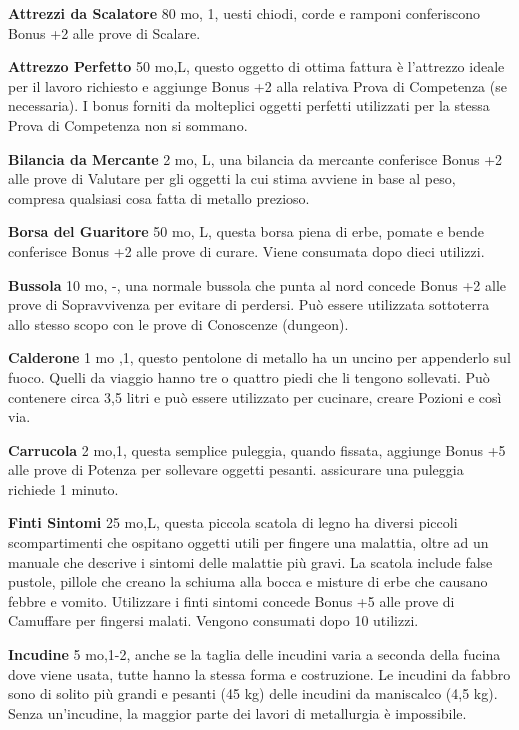 \documentclass[a4paper,11pt,twoside,openany]{book}
\begin{document}
{\textbf{Attrezzi da Scalatore} 80 mo, 1, uesti chiodi, corde e ramponi conferiscono Bonus +2 alle prove di Scalare.

\textbf{Attrezzo Perfetto} 50 mo,L, questo oggetto di ottima fattura è l'attrezzo ideale per il lavoro richiesto e aggiunge Bonus +2 alla relativa Prova di Competenza (se necessaria). I bonus forniti da molteplici oggetti perfetti utilizzati per la stessa Prova di Competenza non si sommano.

\textbf{Bilancia da Mercante} 2 mo, L, una bilancia da mercante conferisce Bonus +2 alle prove di Valutare per gli oggetti la cui stima avviene in base al peso, compresa qualsiasi cosa fatta di metallo prezioso.

\textbf{Borsa del Guaritore} 50 mo, L, questa borsa piena di erbe, pomate e bende conferisce Bonus +2 alle prove di curare. Viene consumata dopo dieci utilizzi.

\textbf{Bussola} 10 mo, -, una normale bussola che punta al nord concede Bonus +2 alle prove di Sopravvivenza per evitare di perdersi. Può essere utilizzata sottoterra allo stesso scopo con le prove di Conoscenze (dungeon).

\textbf{Calderone} 1 mo ,1, questo pentolone di metallo ha un uncino per appenderlo sul fuoco. Quelli da viaggio hanno tre o quattro piedi che li tengono sollevati. Può contenere circa 3,5 litri e può essere utilizzato per cucinare, creare Pozioni e così via.

\textbf{Carrucola} 2 mo,1, questa semplice puleggia, quando fissata, aggiunge Bonus +5 alle prove di Potenza per sollevare oggetti pesanti. assicurare una puleggia richiede 1 minuto.

\textbf{Finti Sintomi} 25 mo,L, questa piccola scatola di legno ha diversi piccoli scompartimenti che ospitano oggetti utili per fingere una malattia, oltre ad un manuale che descrive i sintomi delle malattie più gravi. La scatola include false pustole, pillole che creano la schiuma alla bocca e misture di erbe che causano febbre e vomito. 
Utilizzare i finti sintomi concede Bonus +5 alle prove di Camuffare per fingersi malati. Vengono consumati dopo 10 utilizzi.

\textbf{Incudine} 5 mo,1-2, anche se la taglia delle incudini varia a seconda della fucina dove viene usata, tutte hanno la stessa forma e costruzione. Le incudini da fabbro sono di solito più grandi e pesanti (45 kg) delle incudini da maniscalco (4,5 kg). 
Senza un'incudine, la maggior parte dei lavori di metallurgia è impossibile.

}
\end{document}
